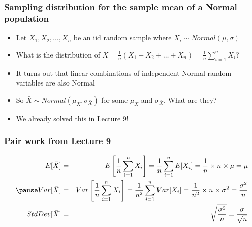 \documentclass[t,compress,mathserif]{beamer}
\begin{document}
\begin{frame}
\frametitle{Sampling distribution for the sample mean of a Normal population}
\begin{itemize}
    \item Let $X_1, X_2, \ldots, X_n$ be an iid random sample where $X_i \sim Normal(\mu, \sigma)$
    \item What is the distribution of $\bar{X}=\frac{1}{n}(X_1 + X_2 + \ldots + X_n)=\frac{1}{n}\sum_{i=1}^{n} X_i$?
    \pause
    \item It turns out that linear combinations of independent Normal random variables are also Normal
    \item So $\bar{X}\sim Normal\left(\mu_{\bar{X}}, \sigma_{\bar{X}}\right)$ for some $\mu_{\bar{X}}$ and $\sigma_{\bar{X}}$. What are they?
    \pause
    \item We already solved this in Lecture 9!
\end{itemize}
\end{frame}

\begin{frame}
\frametitle{Pair work from Lecture 9}

\begin{eqnarray*} 
E[\bar{X}] &=& E\left[\frac{1}{n}\sum_{i=1}^{n} X_i\right] = \frac{1}{n}\sum_{i=1}^{n} E[X_i] = \frac{1}{n}\times n \times \mu = \mu \\
\pause
Var[\bar{X}] &=& Var\left[\frac{1}{n}\sum_{i=1}^{n} X_i\right] = \frac{1}{n^2}\sum_{i=1}^{n} Var[X_i] = \frac{1}{n^2}\times n \times \sigma^2 = \frac{\sigma^2}{n} \\
StdDev[\bar{X}] &=& \sqrt{\frac{\sigma^2}{n}} = \frac{\sigma}{\sqrt{n}}
\end{eqnarray*} 

\end{frame}
\end{document}
